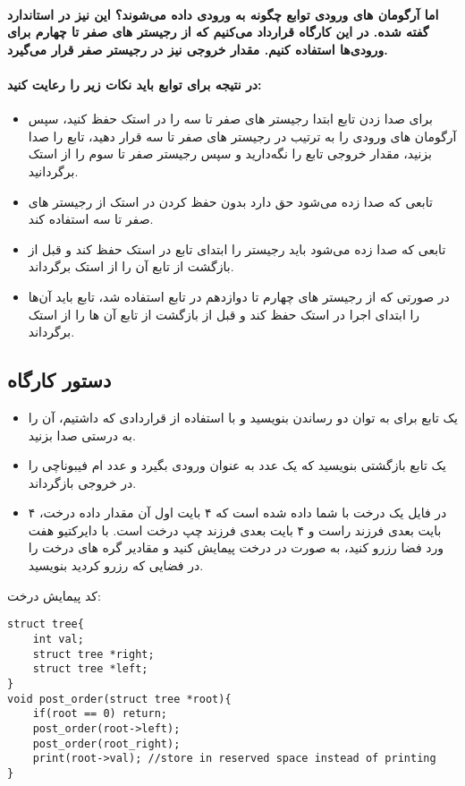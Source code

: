 \paragraph{اما آرگومان های ورودی توابع چگونه به ورودی داده می‌شوند؟ این نیز در استاندارد  گفته شده. در این کارگاه قرارداد می‌کنیم که از رجیستر های صفر تا چهارم برای ورودی‌ها استفاده کنیم. مقدار خروجی نیز در رجیستر صفر قرار می‌گیرد.}

\paragraph{
در نتیجه برای توابع باید نکات زیر را رعایت کنید:
}
\begin{itemize}
    \item برای صدا زدن تابع ابتدا رجیستر های صفر تا سه را در استک حفظ کنید، سپس آرگومان های ورودی را به ترتیب در رجیستر های صفر تا سه قرار دهید، تابع را صدا بزنید، مقدار خروجی تابع را نگه‌دارید و سپس رجیستر صفر تا سوم را از استک برگردانید.
    \item تابعی که صدا زده می‌شود حق دارد بدون حفظ کردن در استک از رجیستر های صفر تا سه استفاده کند.
    \item تابعی که صدا زده می‌شود باید رجیستر  را ابتدای تابع در استک حفظ کند و قبل از بازگشت از تابع آن را از استک برگرداند.
    \item در صورتی که از رجیستر های چهارم تا دوازدهم در تابع استفاده شد، تابع باید آن‌ها را ابتدای اجرا در استک حفظ کند و قبل از بازگشت از تابع آن ها را از استک برگرداند.
\end{itemize}

\subsection{دستور کارگاه}


\begin{itemize}
    \item یک تابع برای به توان دو رساندن بنویسید و با استفاده از قراردادی که داشتیم، آن را به درستی صدا بزنید.
    \item یک تابع بازگشتی بنویسید که یک عدد  به عنوان ورودی بگیرد و عدد ام فیبوناچی را در خروجی بازگرداند.
    \item در فایل 
    یک درخت با شما داده شده است که ۴ بایت اول آن مقدار داده درخت، ۴ بایت بعدی فرزند راست و ۴ بایت بعدی فرزند چپ درخت است. با دایرکتیو 
    هفت ورد فضا رزرو کنید، به صورت 
    در درخت پیمایش کنید و مقادیر گره های درخت را در فضایی که رزرو کردید بنویسید.
\end{itemize}


کد پیمایش درخت:
\begin{latin}
\begin{lstlisting}
struct tree{
    int val;
    struct tree *right;
    struct tree *left;
}
void post_order(struct tree *root){
    if(root == 0) return;
    post_order(root->left);
    post_order(root_right);
    print(root->val); //store in reserved space instead of printing
}
\end{lstlisting}
\end{latin}